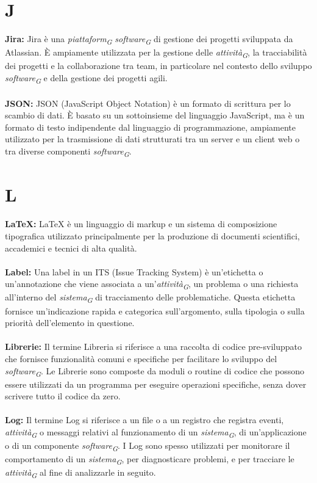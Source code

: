 \documentclass{article}
\begin{document}
\section*{J}
{}
\textbf{Jira:} Jira è una \textit{piattaform}\textsubscript{\textit{G}} \textit{software}\textsubscript{\textit{G}} di gestione dei progetti sviluppata da Atlassian. È ampiamente utilizzata per la gestione delle \textit{attività}\textsubscript{\textit{G}}, la tracciabilità dei progetti e la collaborazione tra team, in particolare nel contesto dello sviluppo \textit{software}\textsubscript{\textit{G}} e della gestione dei progetti agili.
\\
\\
\textbf{JSON:} JSON (JavaScript Object Notation) è un formato di scrittura per lo scambio di dati. È basato su un sottoinsieme del linguaggio JavaScript, ma è un formato di testo indipendente dal linguaggio di programmazione, ampiamente utilizzato per la trasmissione di dati strutturati tra un server e un client web o tra diverse componenti \textit{software}\textsubscript{\textit{G}}.
\pagebreak
\section*{L}
{}
\textbf{LaTeX:} LaTeX è un linguaggio di markup e un sistema di composizione tipografica utilizzato principalmente per la produzione di documenti scientifici, accademici e tecnici di alta qualità.
\\
\\
\textbf{Label:} Una label in un ITS (Issue Tracking System) è un'etichetta o un'annotazione che viene associata a un'\textit{attività}\textsubscript{\textit{G}}, un problema o una richiesta all'interno del \textit{sistema}\textsubscript{\textit{G}} di tracciamento delle problematiche. Questa etichetta fornisce un'indicazione rapida e categorica sull'argomento, sulla tipologia o sulla priorità dell'elemento in questione.
\\
\\
\textbf{Librerie:} Il termine Libreria si riferisce a una raccolta di codice pre-sviluppato che fornisce funzionalità comuni e specifiche per facilitare lo sviluppo del \textit{software}\textsubscript{\textit{G}}. Le Librerie sono composte da moduli o routine di codice che possono essere utilizzati da un programma per eseguire operazioni specifiche, senza dover scrivere tutto il codice da zero.
\\
\\
\textbf{Log:} Il termine Log si riferisce a un file o a un registro che registra eventi, \textit{attività}\textsubscript{\textit{G}} o messaggi relativi al funzionamento di un \textit{sistema}\textsubscript{\textit{G}}, di un'applicazione o di un componente \textit{software}\textsubscript{\textit{G}}. I Log sono spesso utilizzati per monitorare il comportamento di un \textit{sistema}\textsubscript{\textit{G}}, per diagnosticare problemi, e per tracciare le \textit{attività}\textsubscript{\textit{G}} al fine di analizzarle in seguito.
\pagebreak
\end{document}
